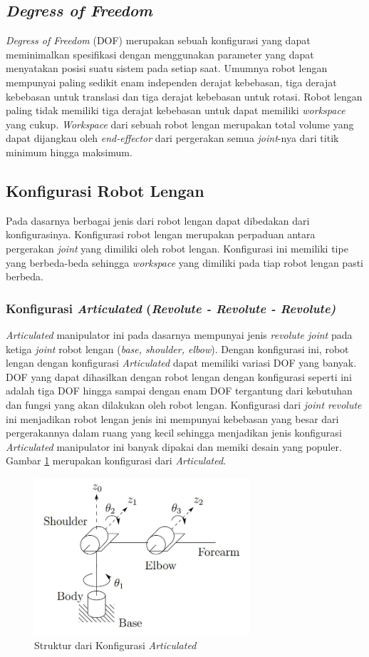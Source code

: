 \subsection{\emph{Degress of Freedom }}
\emph{Degress of Freedom} (DOF) merupakan sebuah konfigurasi yang dapat meminimalkan spesifikasi dengan menggunakan parameter yang dapat menyatakan posisi suatu sistem pada setiap saat. Umumnya robot lengan mempunyai paling sedikit enam independen derajat kebebasan, tiga derajat kebebasan untuk translasi dan tiga derajat kebebasan untuk rotasi. Robot lengan paling tidak memiliki tiga derajat kebebasan untuk dapat memiliki \emph{workspace} yang cukup. \emph{Workspace} dari sebuah robot lengan merupakan total volume yang dapat dijangkau oleh \emph{end-effector} dari pergerakan semua \emph{joint}-nya dari titik minimum hingga maksimum\cite{Spong2006}. 

\subsection{Konfigurasi Robot Lengan}
Pada dasarnya berbagai jenis dari robot lengan dapat dibedakan dari konfigurasinya. Konfigurasi robot lengan merupakan perpaduan antara pergerakan \emph{joint} yang dimiliki oleh robot lengan. Konfigurasi ini memiliki tipe yang berbeda-beda sehingga \emph {workspace} yang dimiliki pada tiap robot lengan pasti berbeda.

\subsubsection{Konfigurasi \emph{Articulated} (\emph{Revolute - Revolute - Revolute)}} 
\emph{Articulated} manipulator ini pada dasarnya mempunyai jenis \emph{revolute joint} pada ketiga \emph{joint} robot lengan (\emph {base, shoulder, elbow}). Dengan konfigurasi ini, robot lengan dengan konfigurasi \textit{Articulated} dapat memiliki variasi DOF yang banyak. DOF yang dapat dihasilkan dengan robot lengan dengan konfigurasi seperti ini adalah tiga DOF hingga sampai dengan enam DOF tergantung dari kebutuhan dan fungsi yang akan dilakukan oleh robot lengan. Konfigurasi dari \textit{joint revolute} ini menjadikan robot lengan jenis ini mempunyai kebebasan yang besar dari pergerakannya dalam ruang yang kecil sehingga menjadikan jenis konfigurasi \textit{Articulated} manipulator ini banyak dipakai dan memiki desain yang populer. Gambar \ref{pic.articulated} merupakan konfigurasi dari \textit{Articulated}.
	\begin{figure}[H]
	\centering
	\includegraphics[width=8cm]{gambar/articulated.jpg}
	\caption{Struktur dari Konfigurasi  \textit{Articulated}\cite{Spong2006}}
	\label{pic.articulated}
\end{figure}
